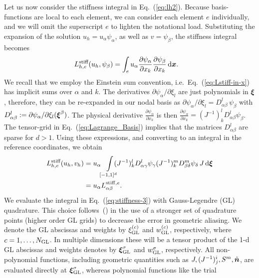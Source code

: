 Let us now consider the stiffness integral in Eq.~(\ref{eq:lh2}). Because basis-functions are local to each element, we can consider each element $e$ individually, and we will omit the superscript $e$ to lighten the notational load.   Substituting the expansion of the solution $u_h=u_\alpha\psi_\alpha$, as well as $v=\psi_\beta$, the stiffness integral becomes
%
\begin{align}
  \label{eq:Lstiff-in-x}
  L^{\text{stiff}}_{h,e}(u_h, \psi_\beta) & = \int_e u_\alpha \frac{\partial\psi_\alpha}{\partial x_k}\frac{\partial \psi_\beta}{\partial x_k}\,\mathrm{d}\boldsymbol{x}.
\end{align}
We recall that we employ the Einstein sum convention, i.e.\ Eq.~(\ref{eq:Lstiff-in-x}) has implicit sums over $\alpha$ and $k$. 
  The derivatives $\partial\psi_\alpha/\partial\xi_l$ are just
polynomials in $\boldsymbol{\xi}$, therefore, they can be re-expanded in our
nodal basis as $\partial\psi_\alpha/\partial\xi_l =
D^l_{\alpha\beta}\, \psi_\beta$ with
$D^l_{\alpha\beta}:=\partial\psi_\alpha/\partial\xi_l(\boldsymbol{\xi}^\beta)$.  The physical derivative $\frac{\partial \psi_{\alpha}}{\partial x_k} $ is then $\frac{\partial \psi_\alpha}{\partial x_k} = (J^{-1})^l_kD^l_{\alpha\beta}\psi_{\beta} $. The tensor-grid in Eq.~(\ref{eq:Lagrange_Basis}) implies that 
the matrices $D^l_{\alpha\beta}$ are sparse for $d>1$.  Using these expressions, and converting to
an integral in the reference coordinates, we obtain
%
\begin{align}\label{eq:stiffness-3}
  L^{\text{stiff}}_{h,e}(u_h, v_h)
&  = u_\alpha \!
\int\displaylimits_{[-1,1]^{d}}
\!\!\!\!
    (J^{-1})^l_kD^l_{\alpha\gamma}\psi_{\gamma}
    (J^{-1})^m_kD^m_{\beta\delta}\psi_{\delta}
    \,J\,\mathrm{d}\boldsymbol{\xi}\\
\label{eq:temp-C}
    &  =u_\alpha L^{{\rm stiff},e}_{\alpha\beta}.
\end{align}
We evaluate the integral in Eq.~(\ref{eq:stiffness-3}) with Gauss-Legendre (GL) quadrature.
This choice follows~(\citet*{mengaldo2015dealiasing}) in the use of a stronger set of quadrature points
 (higher order GL grids) to decrease the error in geometric aliasing.  We denote the GL abscissas and weights by $\xi_{\rm GL}^{(c)}$ and $w_{\rm GL}^{(c)}$, respectively, where $c=1,\ldots, N_{\rm GL}$.  In multiple dimensions these will be a tensor product of the 1-d GL abscissas and weights denotes by $\boldsymbol{\xi}^\sigma_{\rm GL}$ and $w^\sigma_{\rm GL}$, respectively.  All non-polynomial functions,
including geometric quantities such as $J, (J^{-1})^i_j, S^m, \Hat{\boldsymbol{n}}$, are evaluated directly at $\boldsymbol{\xi}^\sigma_{\rm GL}$, whereas polynomial functions like the trial
